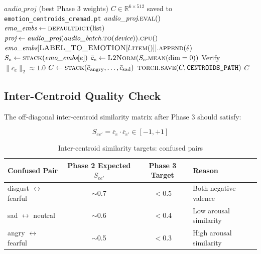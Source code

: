 \documentclass[12pt,a4paper]{article}
\theoremstyle{definition}
\theoremstyle{remark}
\begin{document}
\begin{algorithm}[H]
\caption{Compute Phase 3 Final Emotion Centroids}
\label{alg:centroids}
\begin{algorithmic}[1]
\Require $\textit{audio\_proj}$ (best Phase 3 weights)
\Ensure $C \in \mathbb{R}^{6 \times 512}$ saved to \texttt{emotion\_centroids\_cremad.pt}
\State $\textit{audio\_proj}.\textsc{eval}()$
\State $\textit{emo\_embs} \gets \textsc{defaultdict}(\text{list})$
  \State $\textit{proj} \gets \textit{audio\_proj}(\textit{audio\_batch}.\textsc{to}(\textit{device})).\textsc{cpu}()$
    \State $\textit{emo\_embs}[\textsc{LABEL\_TO\_EMOTION}[l.\textsc{item}()]].\textsc{append}(\hat{e})$
  \EndFor
\EndFor
{}
  \State $S_e \gets \textsc{stack}(\textit{emo\_embs}[e])$ \Comment{$[N_e, 512]$}
  \State $\bar{c}_e \gets \textsc{L2Norm}(S_e.\textsc{mean}(\text{dim}=0))$
  \State Verify $\|\bar{c}_e\|_2 \approx 1.0$
\EndFor
\State $C \gets \textsc{stack}(\bar{c}_{\text{angry}}, \ldots, \bar{c}_{\text{sad}})$
\State $\textsc{torch.save}(C, \texttt{CENTROIDS\_PATH})$
\State \Return $C$
\end{algorithmic}
\end{algorithm}

\subsection{Inter-Centroid Quality Check}

The off-diagonal inter-centroid similarity matrix after Phase 3 should
satisfy:

\[
  S_{ee'} = \bar{c}_e \cdot \bar{c}_{e'} \in [-1, +1]
\]

\begin{table}[H]
\centering
\caption{Inter-centroid similarity targets: confused pairs}
\begin{tabular}{lccl}
\toprule
Confused Pair & Phase 2 Expected $S_{ee'}$ & Phase 3 Target & Reason \\
\midrule
disgust $\leftrightarrow$ fearful & $\sim$0.7 & $< 0.5$ & Both negative valence \\
sad $\leftrightarrow$ neutral & $\sim$0.6 & $< 0.4$ & Low arousal similarity \\
angry $\leftrightarrow$ fearful & $\sim$0.5 & $< 0.3$ & High arousal similarity \\
\bottomrule
\end{tabular}
\end{table}
\end{document}
